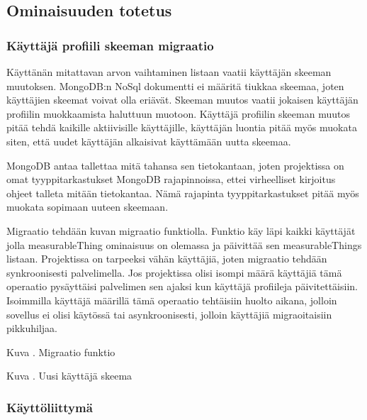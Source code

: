 \subsection{Ominaisuuden totetus}


\subsubsection{Käyttäjä profiili skeeman migraatio}



Käyttänän mitattavan arvon vaihtaminen listaan vaatii käyttäjän skeeman muutoksen.
MongoDB:n NoSql dokumentti ei määritä tiukkaa skeemaa, joten käyttäjien skeemat voivat olla eriävät.
Skeeman muutos vaatii jokaisen käyttäjän profiilin muokkaamista haluttuun muotoon.
Käyttäjä profiilin skeeman muutos pitää tehdä kaikille aktiivisille käyttäjille, käyttäjän luontia pitää myös muokata siten, 
että uudet käyttäjän alkaisivat käyttämään uutta skeemaa.
\medskip

MongoDB antaa tallettaa mitä tahansa sen tietokantaan, joten projektissa on omat tyyppitarkastukset MongoDB rajapinnoissa, 
ettei virheelliset kirjoitus ohjeet talleta mitään tietokantaa.
Nämä rajapinta tyyppitarkastukset pitää myös muokata sopimaan uuteen skeemaan.
\medskip

Migraatio tehdään kuvan \nextImageCount {} migraatio funktiolla. 
Funktio käy läpi kaikki käyttäjät jolla measurableThing ominaisuus on olemassa ja päivittää sen measurableThings listaan.
Projektissa on tarpeeksi vähän käyttäjiä, joten migraatio tehdään synkroonisesti palvelimella. 
Jos projektissa olisi isompi määrä käyttäjiä tämä operaatio pysäyttäisi palvelimen sen ajaksi kun käyttäjä profiileja päivitettäisiin.
Isoimmilla käyttäjä määrillä tämä operaatio tehtäisiin huolto aikana, jolloin sovellus ei olisi käytössä tai asynkroonisesti, 
jolloin käyttäjiä migraoitaisiin pikkuhiljaa.
\medskip


\bigskip
Kuva \getImgCount{}. Migraatio funktio
\medskip


\bigskip
Kuva \getImgCount{}. Uusi käyttäjä skeema
\medskip









\subsubsection{Käyttöliittymä}

